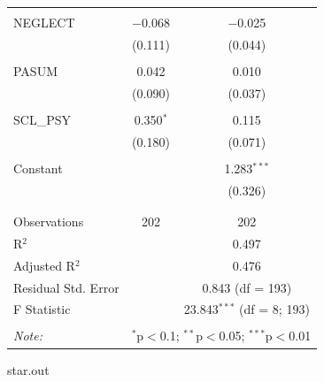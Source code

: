 \documentclass[
]{article}
\newenvironment{Shaded}{\begin{snugshade}}{\end{snugshade}}
\newcommand{\NormalTok}[1]{#1}
\begin{document}
\begin{table}[!htbp]
\begin{tabular}{@{\extracolsep{5pt}}lcc}
  & & \\ 
 NEGLECT & $-$0.068 & $-$0.025 \\ 
  & (0.111) & (0.044) \\ 
  & & \\ 
 PASUM & 0.042 & 0.010 \\ 
  & (0.090) & (0.037) \\ 
  & & \\ 
 SCL\_PSY & 0.350$^{*}$ & 0.115 \\ 
  & (0.180) & (0.071) \\ 
  & & \\ 
 Constant &  & 1.283$^{***}$ \\ 
  &  & (0.326) \\ 
  & & \\ 
\hline \\[-1.8ex] 
Observations & 202 & 202 \\ 
R$^{2}$ &  & 0.497 \\ 
Adjusted R$^{2}$ &  & 0.476 \\ 
Residual Std. Error &  & 0.843 (df = 193) \\ 
F Statistic &  & 23.843$^{***}$ (df = 8; 193) \\ 
\hline 
\hline \\[-1.8ex] 
\textit{Note:}  & \multicolumn{2}{r}{$^{*}$p$<$0.1; $^{**}$p$<$0.05; $^{***}$p$<$0.01} \\ 
\end{tabular} 
\end{table}

\begin{Shaded}
\begin{Highlighting}[]
\NormalTok{star.out}
\end{Highlighting}
\end{Shaded}
\end{document}
